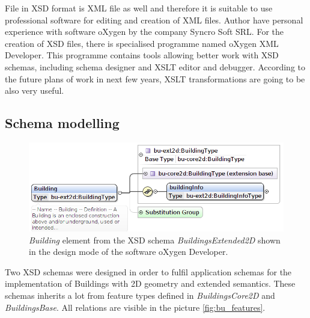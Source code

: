 \documentclass[eprint]{actapoly}
\begin{document}
File in XSD format is XML file as well and therefore it is suitable to use professional software for editing and creation of XML files. Author have personal experience with software oXygen by the company Syncro Soft SRL. For the creation of XSD files, there is specialised programme named oXygen XML Developer. This programme contains tools allowing better work with XSD schemas, including schema designer and XSLT editor and debugger. According to the future plans of work in next few years, XSLT transformations are going to be also very useful. 

\subsection{Schema modelling}
\label{sec:modelling}

\begin{figure}
\centering
\includegraphics[width=0.8\linewidth]{pics/BU_dedicnost_info.png} %
\caption{\textit{Building} element from the XSD schema \textit{BuildingsExtended2D} shown in the design mode of the software oXygen Developer.}
\label{fig:bu_building_element_oxy}
\end{figure}

Two XSD schemas were designed in order to fulfil application schemas for the implementation of Buildings with 2D geometry and extended semantics. These schemas inherits a lot from feature types defined in \textit{BuildingsCore2D} and \textit{BuildingsBase}. All relations are visible in the picture \ref{fig:bu_features}. 
\end{document}
